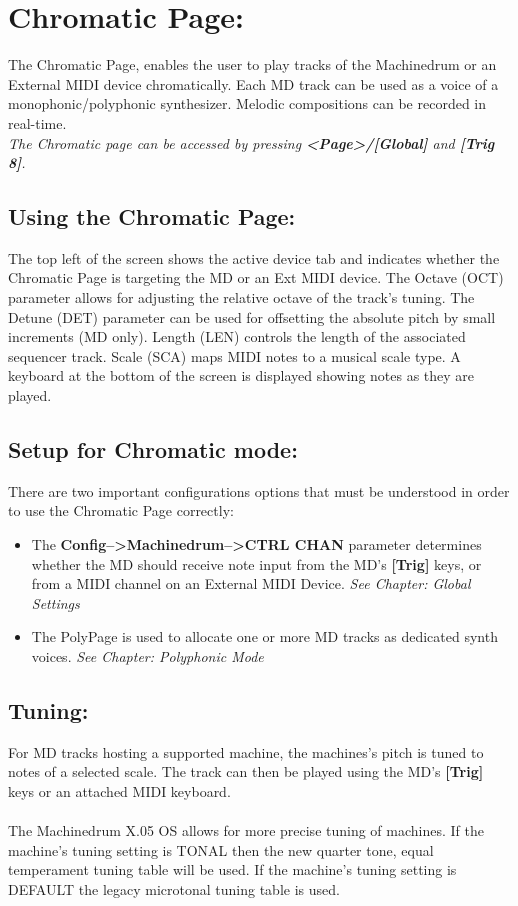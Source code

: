 \chapter{Chromatic Page:}
The Chromatic Page, enables the user to play tracks of the Machinedrum or an External MIDI device chromatically. Each MD track can be used as a voice of a monophonic/polyphonic synthesizer. Melodic compositions can be recorded in real-time.
\\
\textit{The Chromatic page can be accessed by pressing \textbf{<Page>/[Global]} and \textbf{[Trig 8]}.}
\\
\section{Using the Chromatic Page:}
The top left of the screen shows the active device tab and indicates whether the Chromatic Page is targeting the MD or an Ext MIDI device.
The Octave (OCT) parameter allows for adjusting the relative octave of the track's tuning. The Detune (DET) parameter can be used for offsetting the absolute pitch by small increments (MD only). Length (LEN) controls the length of the associated sequencer track. Scale (SCA) maps MIDI notes to a musical scale type.
A keyboard at the bottom of the screen is displayed showing notes as they are played.
\newpage
\section{Setup for Chromatic mode:}
There are two important configurations options that must be understood in order to use the Chromatic Page correctly:
\begin{itemize}
    \item The \textbf{Config-->Machinedrum-->CTRL CHAN} parameter determines whether the MD should receive note input from the MD's \textbf{[Trig]} keys, or from a MIDI channel on an External MIDI Device. \textit{See Chapter: Global Settings}
    \item The PolyPage is used to allocate one or more MD tracks as dedicated synth voices. \textit{See Chapter: Polyphonic Mode} 
\end{itemize}

\section{Tuning:}
For MD tracks hosting a supported machine, the machines’s pitch is tuned to notes of a selected scale. The track can then be played using the MD's \textbf{[Trig]} keys or an attached MIDI keyboard.\\\\
The Machinedrum X.05 OS allows for more precise tuning of machines. If the machine's tuning setting is TONAL then the new quarter tone, equal temperament tuning table will be used. If the machine's tuning setting is DEFAULT the legacy microtonal tuning table is used.
\\
